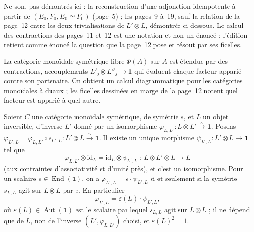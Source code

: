 Ne sont pas démontrés ici : la reconstruction d'une adjonction idempotente à partir de $(E_0, F_0, E_0 \simeq F_0)$ (page~5) ; les pages~9 à~19, sauf la relation de la page~12 entre les deux trivialisations de $L' \otimes L$, démontrée ci-dessous. Le calcul des contractions des pages~11 et~12 est une notation et non un énoncé ; l'édition retient comme énoncé la question que la page~12 pose et résout par ses ficelles.

\begin{encadre}
\begin{definition}
La catégorie monoïdale symétrique libre $\Phi(A)$ sur $A$ est étendue par des contractions, accouplements $L'_j \otimes L''_j \to \mathbf 1$ qui évaluent chaque facteur apparié contre son partenaire. On obtient un calcul diagrammatique pour les catégories monoïdales à duaux ; les ficelles dessinées en marge de la page~12 notent quel facteur est apparié à quel autre.
\end{definition}
\end{encadre}

\begin{encadre}
\begin{theoreme*}
Soient $C$ une catégorie monoïdale symétrique, de symétrie $s$, et $L$ un objet inversible, d'inverse $L'$ donné par un isomorphisme $\varphi_{L,L'} : L \otimes L' \xrightarrow{\sim} \mathbf 1$. Posons $\varphi_{L',L} = \varphi_{L,L'} \circ s_{L',L} : L' \otimes L \xrightarrow{\sim} \mathbf 1$. Il existe un unique morphisme $\psi_{L',L} : L' \otimes L \to \mathbf 1$ tel que
\[
  \varphi_{L,L'} \otimes \mathrm{id}_L = \mathrm{id}_L \otimes \psi_{L',L} \ :\ L \otimes L' \otimes L \longrightarrow L
\]
(aux contraintes d'associativité et d'unité près), et c'est un isomorphisme. Pour un scalaire $e \in \operatorname{End}(\mathbf 1)$, on a $\varphi_{L',L} = e \cdot \psi_{L',L}$ si et seulement si la symétrie $s_{L,L}$ agit sur $L \otimes L$ par $e$. En particulier
\[
  \varphi_{L',L} = \varepsilon(L) \cdot \psi_{L',L},
\]
où $\varepsilon(L) \in \operatorname{Aut}(\mathbf 1)$ est le scalaire par lequel $s_{L,L}$ agit sur $L \otimes L$ ; il ne dépend que de $L$, non de l'inverse $(L', \varphi_{L,L'})$ choisi, et $\varepsilon(L)^2 = 1$.
\end{theoreme*}
\end{encadre}

